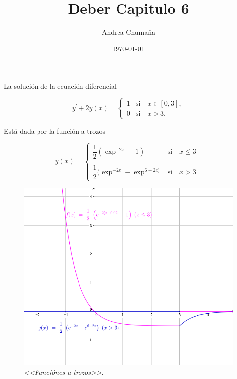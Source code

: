 \documentclass[a3paper, 12pt]{article}
\author{Andrea Chumaña}
\title{Deber Capitulo 6}
\date{\today}
\begin{document}
\maketitle
La solución de la ecuación diferencial
\begin{center}
  \begin{equation*}
y^{'} + 2y(x)= \left\lbrace
\begin{array}{ll}
\text{1} & \text{si} \quad x\in [0,3],\\
\text{0} & \text{si} \quad x > 3.
\end{array}
\right.
\end{equation*}
\end{center}
{\color{magenta}Está dada} por la función a trozos 
\begin{center}
 \begin{equation*}
y(x)= \left\lbrace
\begin{array}{ll}
\dfrac{1}{2}(\exp^{-2x}-1)& \text{si} \quad x\leq 3,\\
\\
\dfrac{1}{2}(\exp^{-2x}-\exp^{6-2x)}& \text{si}  \quad x > 3.
\end{array}
\right.
\end{equation*}
\end{center}
\begin{figure}[h!] 
\centering 
\includegraphics [scale = 0.5]{grafico1}
\caption{ \emph{<<Funciónes a trozos>>}.}
\label{mec} 
\end{figure}
\end{document}
